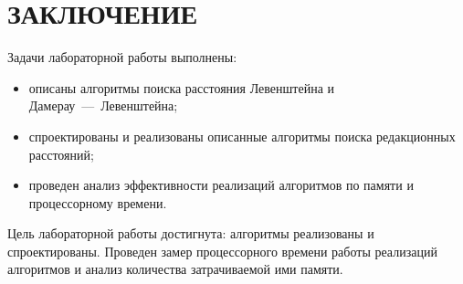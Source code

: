 \chapter*{ЗАКЛЮЧЕНИЕ}

Задачи лабораторной работы выполнены: 

\begin{itemize}[label=--]
	\item описаны алгоритмы поиска расстояния Левенштейна и Дамерау~---~Левенштейна;
	\item спроектированы и реализованы описанные алгоритмы поиска редакционных расстояний;
	\item проведен анализ эффективности реализаций алгоритмов по памяти и процессорному времени.
\end{itemize}

Цель лабораторной работы достигнута: алгоритмы реализованы и спроектированы. Проведен замер процессорного времени работы реализаций алгоритмов и анализ количества затрачиваемой ими памяти.